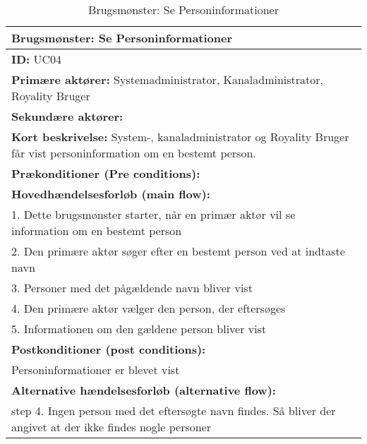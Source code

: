 \begin{table}[H]
    \begin{tabularx}{\textwidth}{|X|}
            \hline
            \textbf{Brugsmønster:}  Se Personinformationer \\ 
            \hline
        	\textbf{ID:} UC04 \\ 
        	\hline
        	\textbf{Primære aktører:} Systemadministrator, Kanaladministrator, Royality Bruger \\ \hline
        	\textbf{Sekundære aktører:} \\ \hline
        	\textbf{Kort beskrivelse:} System-, kanaladministrator og Royality Bruger får vist personinformation om en bestemt person. \\ \hline
        	\textbf{Prækonditioner (Pre conditions):} \\ \hline
        \textbf{Hovedhændelsesforløb (main flow):} \\
        1. Dette brugsmønster starter, når en primær aktør vil se information om en bestemt person \\ 
        2. Den primære aktør søger efter en bestemt person ved at indtaste navn \\ 
        3. Personer med det pågældende navn bliver vist \\ 
        4. Den primære aktør vælger den person, der eftersøges \\
        5. Informationen om den gældene person bliver vist \\ \hline
            \textbf{Postkonditioner (post conditions):} \\
            Personinformationer er blevet vist \\ \hline
        
        	\textbf{Alternative hændelsesforløb (alternative flow):} \\
        step 4. Ingen person med det eftersøgte navn findes. Så bliver der angivet at der ikke findes nogle personer\\ \hline
    \end{tabularx}
    \caption{Brugsmønster: Se Personinformationer}
    \label{table:read_personinfo}
\end{table}



